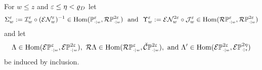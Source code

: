 
For $w\leq z$ and $\varepsilon\leq\eta < \varrho_D$ let
\[\Sigma_w^\e := \I_w^\e\circ (\E\N_w^\e)^{-1}\in \Hom(\PP{w}{\e},\RPP{w}{2\e})\ \text{ and }\ \Upsilon_w^\e := \E\N_w^{2\e}\circ \J_w^{\e}\in \Hom(\RPP{w}{\e},\RPP{w}{2\e})\]
and let
\[ \Lambda\in\Hom(\ext{\PP{w}{\e}}, \ext{\PP{w}{2\e}}),\ \rips\Lambda\in\Hom(\RPP{w}{\e},\CPP{w}{2\e}),\text{ and } \Lambda'\in\Hom(\ext{\PP{w}{2\e}},\ext{\PP{z}{2\eta}})\]
be induced by inclusion. %

